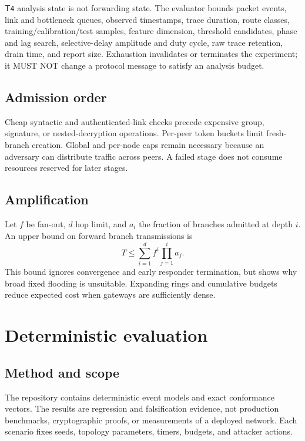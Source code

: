 \documentclass[11pt,oneside]{article}
\newcommand{\Tfour}{\ensuremath{\mathsf{T4}}}
\begin{document}
\Tfour{} analysis state is not forwarding state. The evaluator bounds packet events, link and bottleneck queues, observed timestamps, trace duration, route classes, training/calibration/test samples, feature dimension, threshold candidates, phase and lag search, selective-delay amplitude and duty cycle, raw trace retention, drain time, and report size. Exhaustion invalidates or terminates the experiment; it MUST NOT change a protocol message to satisfy an analysis budget.

\subsection{Admission order}

Cheap syntactic and authenticated-link checks precede expensive group, signature, or nested-decryption operations. Per-peer token buckets limit fresh-branch creation. Global and per-node caps remain necessary because an adversary can distribute traffic across peers. A failed stage does not consume resources reserved for later stages.

\subsection{Amplification}

Let $f$ be fan-out, $d$ hop limit, and $a_i$ the fraction of branches admitted at depth $i$. An upper bound on forward branch transmissions is
\begin{equation}
T\le \sum_{i=1}^{d} f^i\prod_{j=1}^{i}a_j.
\label{eq:amplification}
\end{equation}
This bound ignores convergence and early responder termination, but shows why broad fixed flooding is unsuitable. Expanding rings and cumulative budgets reduce expected cost when gateways are sufficiently dense.

\section{Deterministic evaluation}
\label{sec:evaluation}

\subsection{Method and scope}

The repository contains deterministic event models and exact conformance vectors. The results are regression and falsification evidence, not production benchmarks, cryptographic proofs, or measurements of a deployed network. Each scenario fixes seeds, topology parameters, timers, budgets, and attacker actions.
\end{document}
